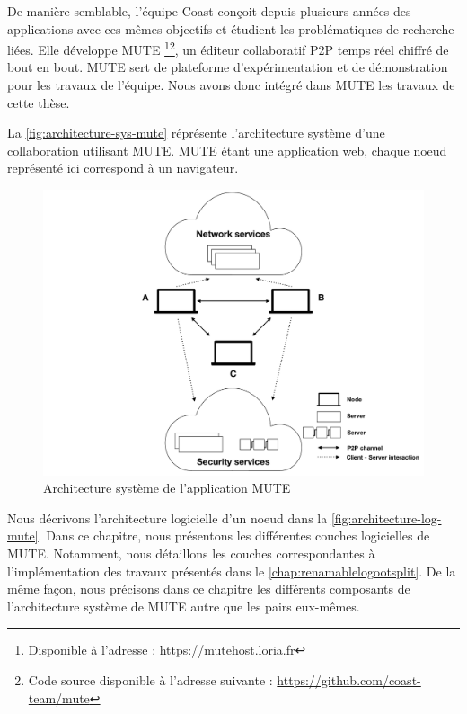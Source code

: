 De manière semblable, l'équipe Coast conçoit depuis plusieurs années des applications avec ces mêmes objectifs et étudient les problématiques de recherche liées.
Elle développe \acf{MUTE} \cite{MUTE2017}\footnote{Disponible à l'adresse : \url{https://mutehost.loria.fr}}\footnote{Code source disponible à l'adresse suivante : \url{https://github.com/coast-team/mute}}, un éditeur collaboratif \ac{P2P} temps réel chiffré de bout en bout.
\ac{MUTE} sert de plateforme d'expérimentation et de démonstration pour les travaux de l'équipe.
Nous avons donc intégré dans \ac{MUTE} les travaux de cette thèse.

La \autoref{fig:architecture-sys-mute} réprésente l'architecture système d'une collaboration utilisant MUTE.
MUTE étant une application web, chaque noeud représenté ici correspond à un navigateur.

\begin{figure}[!ht]
  \centering
  \includegraphics[page=1, trim=0cm 0cm 0cm 0cm, clip, width=.7\linewidth]{img/mute-figures.pdf}
  \caption{Architecture système de l'application MUTE}
  \label{fig:architecture-sys-mute}
\end{figure}

Nous décrivons l'architecture logicielle d'un noeud dans la \autoref{fig:architecture-log-mute}.
Dans ce chapitre, nous présentons les différentes couches logicielles de MUTE.
Notamment, nous détaillons les couches correspondantes à l'implémentation des travaux présentés dans le \autoref{chap:renamablelogootsplit}.
De la même façon, nous précisons dans ce chapitre les différents composants de l'architecture système de MUTE autre que les pairs eux-mêmes.

